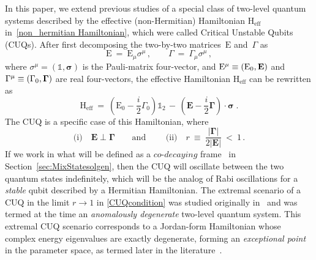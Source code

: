 \documentclass[12pt,a4paper]{article}
\begin{document}
In this paper, we extend previous studies of a special class of two-level quantum systems described by the effective (non-Hermitian) Hamiltonian $\mathrm{H}_{\text{eff}}$ in~\eqref{non_hermitian Hamiltonian}, which were called Critical Unstable Qubits (CUQs)\cite{Karamitros:2022oew,Karamitros:2025azy}. 
After first decomposing the two-by-two matrices~$\text{E}$ and~$\Gamma$ as
\begin{equation}
    \label{eq:defEGamma}
        \mathrm{E}\: =\: \mathrm{E}_\mu \sigma^\mu\,,\qquad 
        \Gamma\: =\: \Gamma_\mu \sigma^\mu\,,
\end{equation}
where $\sigma^\mu = (\mathbb{1},\boldsymbol{\sigma})$ is the Pauli-matrix four-vector, and $\mathrm{E}^{\mu} \equiv ({\rm E}_0, {\bf E})$ and $\mathrm{\Gamma}^{\mu} \equiv (\Gamma_0, {\bf \Gamma})$ are real four-vectors, the effective Hamiltonian $\mathrm{H}_{\text{eff}}$ can be rewritten as
\begin{equation}
    \mathrm{H}_{\text{eff}}\: =\: \left(\mathrm{E}_0-\dfrac{i}{2}\Gamma_0\right)\mathbb{1}_2\, -\, \left(\mathbf{E}-\dfrac{i}{2}\boldsymbol{\Gamma}\right)\!\cdot \boldsymbol{\sigma}\; .
    \label{nonHerm_Hamiltonian_Paulibasis}
\end{equation}
The CUQ is a specific case of this Hamiltonian, where 
\begin{equation}
    \text{(i)}\quad\! \mathbf{E}\perp\boldsymbol{\Gamma}  \qquad \text{and }\qquad \text{(ii)}\quad\! r\:\equiv\: \dfrac{|\boldsymbol{\Gamma}|}{2|\mathbf{E}|}\ <\ 1\,.\label{CUQcondition}
\end{equation}
If we work in what will be defined as a $\textit{co-decaying}$ frame~\cite{Karamitros:2022oew} in Section~\ref{sec:MixStatesolgen}, then the CUQ will oscillate between the two quantum states indefinitely, which will be the analog of Rabi oscillations for a {\em stable} qubit described by a Hermitian Hamiltonian.
The extremal scenario of a CUQ in the limit $r\to 1$ in \eqref{CUQcondition} was studied originally in~\cite{Pilaftsis:1997dr} and was termed at the time
an {\em anomalously degenerate} two-level quantum system. This extremal CUQ scenario corresponds to a Jordan-form Hamiltonian whose complex energy eigenvalues are exactly degenerate, forming an {\em exceptional point} in the parameter space, as termed later in the literature~\cite{Heiss:2012dx}.
\end{document}
